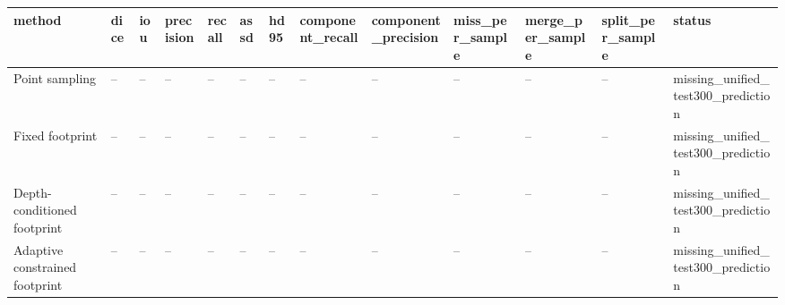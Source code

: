 \begin{tabular}{lllllllllllll}
\toprule
method & dice & iou & precision & recall & assd & hd95 & component\_recall & component\_precision & miss\_per\_sample & merge\_per\_sample & split\_per\_sample & status \\
\midrule
Point sampling & -- & -- & -- & -- & -- & -- & -- & -- & -- & -- & -- & missing\_unified\_test300\_prediction \\
Fixed footprint & -- & -- & -- & -- & -- & -- & -- & -- & -- & -- & -- & missing\_unified\_test300\_prediction \\
Depth-conditioned footprint & -- & -- & -- & -- & -- & -- & -- & -- & -- & -- & -- & missing\_unified\_test300\_prediction \\
Adaptive constrained footprint & -- & -- & -- & -- & -- & -- & -- & -- & -- & -- & -- & missing\_unified\_test300\_prediction \\
\bottomrule
\end{tabular}
